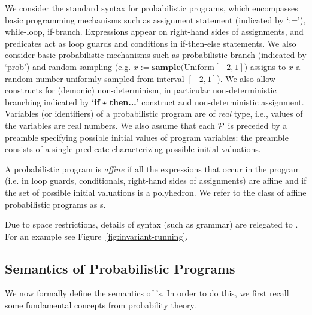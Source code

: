 We consider the standard syntax for probabilistic programs,
which encompasses basic programming mechanisms such as assignment statement 
(indicated by `:='), while-loop, if-branch. Expressions appear on right-hand sides of assignments, and predicates act as loop guards and conditions in if-then-else statements. We also consider basic probabilistic mechanisms 
such as probabilistic branch (indicated by `prob') and random sampling (e.g. 
$x:=\textbf{sample(}\mathrm{Uniform}[-2,1]\textbf{)}$ assigns to $x$ a random 
number 
uniformly sampled from interval $[-2,1]$). We also allow constructs for 
(demonic) non-determinism, in particular 
non-deterministic branching indicated by `\textbf{if }$\star$ \textbf{then...}' construct and non-deterministic assignment.  
Variables (or identifiers) of a probabilistic program are of \emph{real} type, i.e., 
values of the variables are real numbers. 
We also assume that each \PP{} $\mathcal{P}$ is preceded by a preamble 
specifying possible initial values of program variables: the preamble consists 
of a single predicate characterizing possible initial valuations.

\smallskip{}
A probabilistic program is \emph{affine} if all the expressions that occur in 
the program (i.e. in loop guards, conditionals, right-hand sides of 
assignments) are affine and if the set of possible initial valuations is a 
polyhedron. We refer to the class of affine probabilistic programs 
as \APP s.

Due to space restrictions, details of syntax (such as grammar) are relegated to 
\AppendixMaterial.
For an example see Figure~\ref{fig:invariant-running}.




\vspace{-1em}
\subsection{Semantics of Probabilistic Programs}\label{subsec:semantics}
\vspace{-0.5em}

We now formally define the semantics of \PP's.
In order to do this, we first recall some fundamental concepts from probability
theory.

